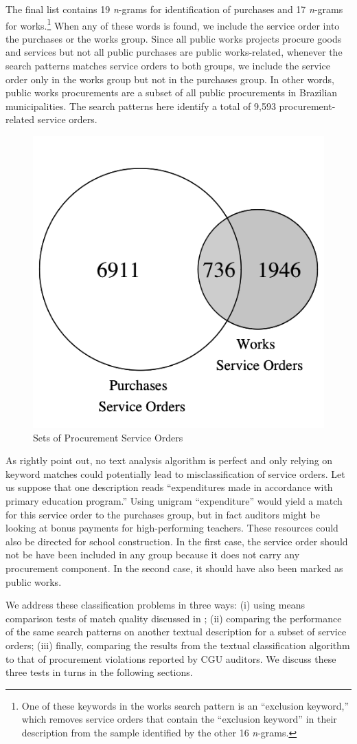 \documentclass[11pt]{article}
\begin{document}
The final list contains 19 \emph{n}-grams for identification of purchases and 17 \emph{n}-grams for works.\footnote{One of these keywords in the works search pattern is an ``exclusion keyword,'' which removes service orders that contain the ``exclusion keyword'' in their description from the sample identified by the other 16 \emph{n}-grams.} When any of these words is found, we include the service order into the purchases or the works group. Since all public works projects procure goods and services but not all public purchases are public works-related, whenever the search patterns matches service orders to both groups, we include the service order only in the works group but not in the purchases group. In other words, public works procurements are a subset of all public procurements in Brazilian municipalities. The search patterns here identify a total of 9,593 procurement-related service orders.

\begin{figure}[!htbp]
\caption{\label{fig:venn} Sets of Procurement Service Orders}
{\centering \includegraphics[width=0.3\linewidth]{venn}

}
\end{figure}

As \citet{GrimmerTextDataPromise2013a} rightly point out, no text analysis algorithm is perfect and only relying on keyword matches could potentially lead to misclassification of service orders. Let us suppose that one description reads ``expenditures made in accordance with primary education program.'' Using unigram ``expenditure'' would yield a match for this service order to the purchases group, but in fact auditors might be looking at bonus payments for high-performing teachers. These resources could also be directed for school construction. In the first case, the service order should not be have been included in any group because it does not carry any procurement component. In the second case, it should have also been marked as public works.

We address these classification problems in three ways: (i) using means comparison tests of match quality discussed in \citet{AssumpcaotextfindDataDrivenText2018}; (ii) comparing the performance of the same search patterns on another textual description for a subset of service orders; (iii) finally, comparing the results from the textual classification algorithm to that of procurement violations reported by CGU auditors. We discuss these three tests in turns in the following sections.
\end{document}
